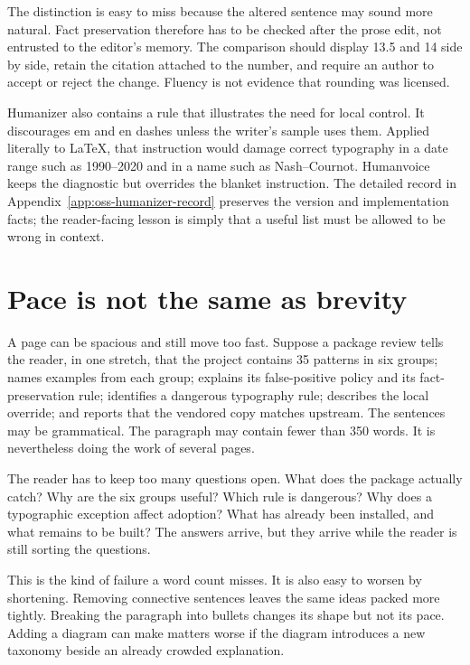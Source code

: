 The distinction is easy to miss because the altered sentence may sound more
natural. Fact preservation therefore has to be checked after the prose edit,
not entrusted to the editor's memory. The comparison should display 13.5 and
14 side by side, retain the citation attached to the number, and require an
author to accept or reject the change. Fluency is not evidence that rounding
was licensed.

Humanizer also contains a rule that illustrates the need for local control. It
discourages em and en dashes unless the writer's sample uses them. Applied
literally to LaTeX, that instruction would damage correct typography in a date
range such as 1990--2020 and in a name such as Nash--Cournot. Humanvoice keeps
the diagnostic but overrides the blanket instruction. The detailed record in
Appendix~\ref{app:oss-humanizer-record} preserves the version and implementation
facts; the reader-facing lesson is simply that a useful list must be allowed
to be wrong in context.

\section{Pace is not the same as brevity}
\label{sec:oss-pace}

A page can be spacious and still move too fast. Suppose a package review tells
the reader, in one stretch, that the project contains 35 patterns in six
groups; names examples from each group; explains its false-positive policy and
its fact-preservation rule; identifies a dangerous typography rule; describes
the local override; and reports that the vendored copy matches upstream. The
sentences may be grammatical. The paragraph may contain fewer than 350 words.
It is nevertheless doing the work of several pages.

The reader has to keep too many questions open. What does the package actually
catch? Why are the six groups useful? Which rule is dangerous? Why does a
typographic exception affect adoption? What has already been installed, and
what remains to be built? The answers arrive, but they arrive while the reader
is still sorting the questions.

This is the kind of failure a word count misses. It is also easy to worsen by
shortening. Removing connective sentences leaves the same ideas packed more
tightly. Breaking the paragraph into bullets changes its shape but not its
pace. Adding a diagram can make matters worse if the diagram introduces a new
taxonomy beside an already crowded explanation.

